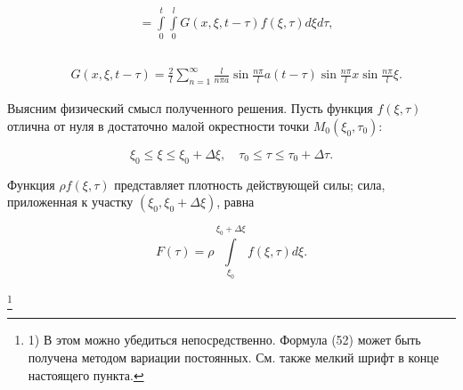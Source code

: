 \documentclass{article}
\begin{document}
\begin{equation}
    \begin{aligned}
        &= \int\limits_{0}^{t} \int\limits_{0}^{l} G(x, \xi, t - \tau) f(\xi, \tau) d\xi d\tau,  \\
        \end{aligned} \tag{55}
\end{equation}
 \\
\begin{equation}
    \begin{aligned}
        &G(x, \xi, t - \tau) = \frac{2}{l} \sum_{n=1}^{\infty} \frac{l}{n\pi a} \sin{\frac{n\pi}{l} a (t - \tau)} \sin{\frac{n\pi}{l} x} \sin{\frac{n\pi}{l} \xi}. 
    \end{aligned} \tag{56}
\end{equation}

\noindent
Выясним физический смысл полученного решения. Пусть функция $f(\xi, \tau)$ отлична от нуля в достаточно малой окрестности точки $M_0(\xi_0, \tau_0)$:

\begin{equation*}
    \xi_0 \le \xi \le \xi_0 + \Delta\xi, \quad \tau_0 \le \tau \le \tau_0 + \Delta\tau.
\end{equation*}

\noindent
Функция $\rho f(\xi, \tau)$ представляет плотность действующей силы; сила, приложенная к участку $(\xi_0, \xi_0 + \Delta\xi)$, равна

\begin{equation*}
    F(\tau) = \rho \int\limits_{\xi_0}^{\xi_0 + \Delta\xi} f(\xi, \tau) d\xi.
\end{equation*}

\noindent
\footnote{1) В этом можно убедиться непосредственно. Формула (52) может быть получена методом вариации постоянных. См. также мелкий шрифт в конце настоящего пункта.}
\end{document}
